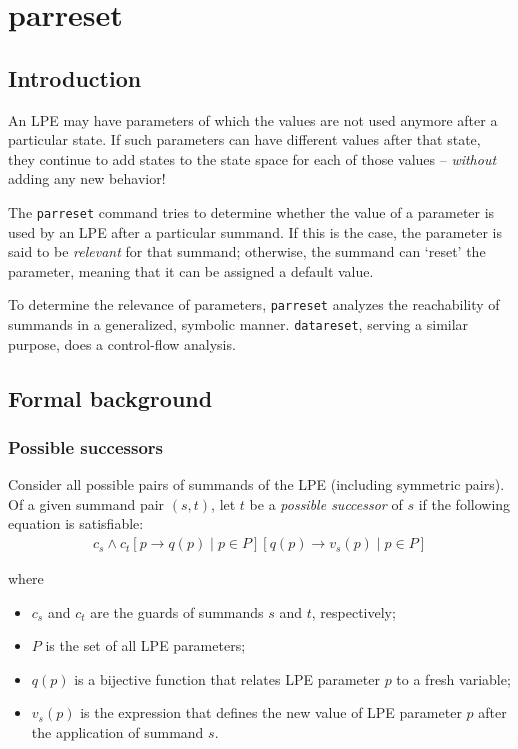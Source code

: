 \chapter{parreset}

\section{Introduction}

An LPE may have parameters of which the values are not used anymore after a particular state.
If such parameters can have different values after that state, they continue to add states to the state space for each of those values -- \emph{without} adding any new behavior!

The \texttt{parreset} command tries to determine whether the value of a parameter is used by an LPE after a particular summand.
If this is the case, the parameter is said to be \emph{relevant} for that summand; otherwise, the summand can `reset' the parameter, meaning that it can be assigned a default value.

To determine the relevance of parameters, \texttt{parreset} analyzes the reachability of summands in a generalized, symbolic manner.
\texttt{datareset}, serving a similar purpose, does a control-flow analysis.

\section{Formal background}

\subsection{Possible successors}

Consider all possible pairs of summands of the LPE (including symmetric pairs).
Of a given summand pair $(s, t)$, let $t$ be a \emph{possible successor} of $s$ if the following equation is satisfiable:
\begin{align*}
c_s \land {c_t}[p \rightarrow q(p) \;|\; p \in P][q(p) \rightarrow v_s(p) \;|\; p \in P]
\end{align*}

where

\begin{itemize}
\item $c_s$ and $c_t$ are the guards of summands $s$ and $t$, respectively;
\item $P$ is the set of all LPE parameters;
\item $q(p)$ is a bijective function that relates LPE parameter $p$ to a fresh variable;
\item $v_s(p)$ is the expression that defines the new value of LPE parameter $p$ after the application of summand $s$.
\end{itemize}

